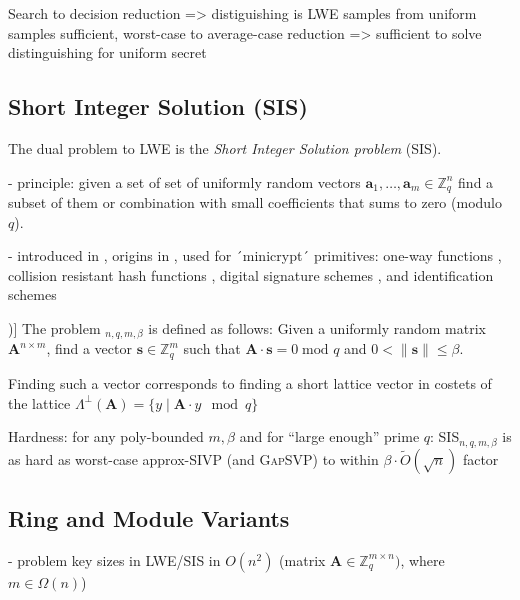 \documentclass[
  a4paper,  %
  twoside,  %
  bibliography=totoc,
  headsepline,
  cleardoublepage=empty,
  parskip=half,
  draft=false
]{scrbook}
\begin{document}
Search to decision reduction => distiguishing is LWE samples from uniform samples sufficient, worst-case to average-case reduction => sufficient to solve distinguishing for uniform secret

\subsection{Short Integer Solution (SIS)}
The dual problem to LWE is the \textit{Short Integer Solution problem} (SIS).

- principle: given a set of set of uniformly random vectors $\mathbf{a}_1, \ldots, \mathbf{a}_m \in \mathbb{Z}_q^n$ find a subset of them or combination with small coefficients that sums to zero (modulo $q$). %

- introduced in \cite{MR04}, origins in \cite{Ajt96}, used for ´minicrypt´ primitives: one-way functions \cite{Ajt96}, collision resistant hash functions \cite{GGH96}, digital signature schemes \cite{GPV08, CHKP10}, and identification schemes \cite{MV03, Lyu08, KTX07} %

\begin{definition}[SIS Problem (Adapted from [\citealp{LS15}, Definition 3.1])]
  The problem $_{n, q, m, \beta}$ is defined as follows: Given a uniformly random matrix $\mathbf{A}^{n\times m}$, find a vector $\mathbf{s} \in \mathbb{Z}_q^m$ such that $\mathbf{A} \cdot \mathbf{s} = 0 \; \text{mod } q$ and $0 < \| \mathbf{s}\| \leq \beta$.
\end{definition}

Finding such a vector corresponds to finding a short lattice vector in costets of the lattice $\Lambda^{\perp}(\mathbf{A}) = \{ y \mid \mathbf{A} \cdot y \mod q \}$ %

Hardness: for any poly-bounded $m, \beta$ and for ``large enough'' prime $q$: SIS$_{n, q, m, \beta}$ is as hard as worst-case approx-SIVP (and \textsc{GapSVP}) to within $\beta \cdot \tilde{O}(\sqrt{n})$ factor



\subsection{Ring and Module Variants}
- problem key sizes in LWE/SIS in $O(n^2)$ (matrix $\mathbf{A} \in \mathbb{Z}_q^{m \times n})$, where $m \in \Omega(n)$)%
\end{document}
